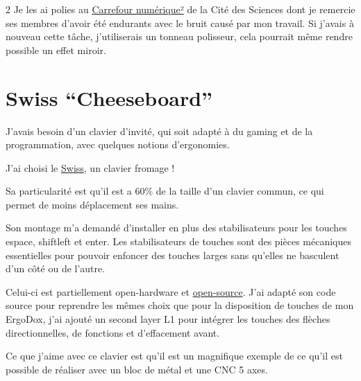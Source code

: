 \documentclass[a4paper,11pt]{article}
\begin{document}
\begin{blogmain}
\begin{multicols}{2}
Je les ai polies au \href{https://www.cite-sciences.fr/fr/au-programme/lieux-ressources/carrefour-numerique2/fab-lab}{Carrefour numérique²} de la Cité des Sciences dont je remercie ses membres d'avoir été endurants avec le bruit causé par mon travail.
Si j'avais à nouveau cette tâche, j'utiliserais un tonneau polisseur, cela pourrait même rendre possible un effet miroir.


\end{multicols}

\newpage

\section{Swiss \enquote{Cheeseboard}}
J'avais besoin d'un clavier d'invité, qui soit adapté à du gaming et de la programmation, avec quelques notions d'ergonomies.

J'ai choisi le \href{https://geekhack.org/index.php?topic=108522.0}{Swiss}, un clavier fromage !

Sa particularité est qu'il est a 60\% de la taille d'un clavier commun, ce qui permet de moins déplacement ses mains.

Son montage m'a demandé d'installer en plus des stabilisateurs pour les touches espace, shiftleft et enter.
Les stabilisateurs de touches sont des pièces mécaniques essentielles pour pouvoir enfoncer des touches larges sans qu'elles ne basculent d'un côté ou de l'autre.


Celui-ci est partiellement open-hardware et \href{https://github.com/qmk/qmk_firmware/blob/master/keyboards/ergodox_ez/readme.md}{open-source}. J'ai adapté son code source pour reprendre les mêmes choix que pour la disposition de touches de mon ErgoDox, j'ai ajouté un second layer L1 pour intégrer les touches des flèches directionnelles, de fonctions et d'effacement avant.

\newpage

Ce que j'aime avec ce clavier est qu'il est un magnifique exemple de ce qu'il est possible de réaliser avec un bloc de métal et une CNC 5 axes.


\end{blogmain}
\end{document}
